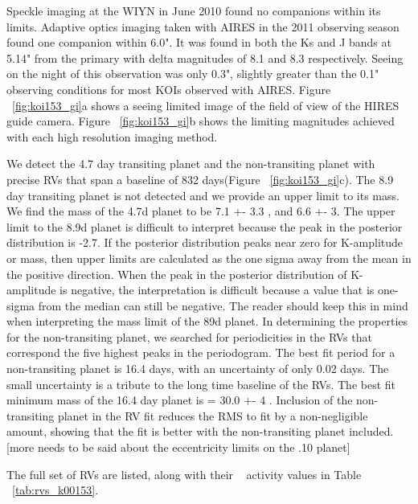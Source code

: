 \documentclass{emulateapj}
\begin{document}
Speckle imaging at the WIYN in June 2010 found no companions within its limits. Adaptive optics imaging taken with AIRES in the 2011 observing season found one companion within 6.0". It was found in both the Ks and J bands at 5.14" from the primary with delta magnitudes of 8.1 and 8.3 respectively. Seeing on the night of this observation was only 0.3", slightly greater than the 0.1" observing conditions for most KOIs observed with AIRES. Figure ~\ref{fig:koi153_gi}a shows a seeing limited  image of the field of view of the HIRES guide camera.  Figure ~\ref{fig:koi153_gi}b shows the limiting magnitudes achieved with each high resolution
 imaging method.  

We detect the 4.7 day transiting planet and the non-transiting planet with precise RVs that span a baseline of 832 days(Figure ~\ref{fig:koi153_gi}c). The 8.9 day transiting planet is not detected and we provide an upper limit to its mass. We find the mass of the 4.7d planet to be 7.1 +- 3.3 \mearthe, and 6.6 +- 3\gcc. The upper limit to the 8.9d planet is difficult to interpret because the peak in the posterior distribution is -2.7\ms. If the posterior distribution peaks near zero for K-amplitude or mass, then upper limits are calculated as the one sigma away from the mean in the positive direction. When the peak in the posterior distribution of K-amplitude is negative, the interpretation is difficult because a value that is one-sigma from the median can still be negative. The reader should keep this in mind when interpreting the mass limit of the 89d planet.  In determining the properties for the non-transiting planet, we searched for periodicities in the RVs that correspond the five highest peaks in the periodogram. The best fit period for a non-transiting planet is 16.4 days, with an uncertainty of only 0.02 days. The small uncertainty is a tribute to the long time baseline of the RVs. The best fit minimum mass of the 16.4 day planet is \msini = 30.0 +- 4  \mearthe. Inclusion of the non-transiting planet in the RV fit reduces the RMS to fit by a non-negligible amount, showing that the fit is better with the non-transiting planet included.[more needs to be said about the eccentricity limits on the .10 planet]

The full set of RVs are listed, along with their \rphk~ activity values in Table ~\ref{tab:rvs_k00153}.
\end{document}
